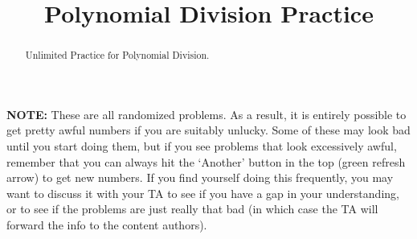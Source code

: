 \documentclass{ximera}
\title{Polynomial Division Practice}
\begin{document}
\begin{abstract}
    Unlimited Practice for Polynomial Division.
\end{abstract}%
\maketitle

\textbf{NOTE:} These are all randomized problems. As a result, it is entirely possible to get pretty awful numbers if you are suitably unlucky. Some of these may look bad until you start doing them, but if you see problems that look excessively awful, remember that you can always hit the `Another' button in the top (green refresh arrow) to get new numbers. If you find yourself doing this frequently, you may want to discuss it with your TA to see if you have a gap in your understanding, or to see if the problems are just really that bad (in which case the TA will forward the info to the content authors).
\end{document}
